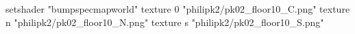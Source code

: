 setshader "bumpspecmapworld"
    texture 0 "philipk2/pk02_floor10_C.png"
    texture n "philipk2/pk02_floor10_N.png"
    texture s "philipk2/pk02_floor10_S.png"